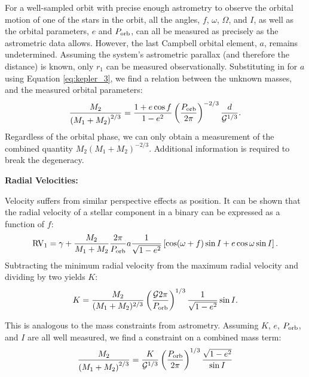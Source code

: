 \documentclass[12pt,preprint]{hackaastex}
\newcommand{\Porb}{\ifmmode {P_{\rm orb}}\else${P_{\rm orb}}$\fi}
\newcommand{\RV}{\ifmmode {{\rm RV}}\else RV \fi}
\newcommand{\bigG}{\ifmmode {\mathcal{G}}\else${\mathcal{G}}$\fi}
\begin{document}
For a well-sampled orbit with precise enough astrometry to observe the orbital motion of one of the stars in the orbit, all the angles, $f$, $\omega$, $\Omega$, and $I$, as well as the orbital parameters, $e$  and $P_{\rm orb}$, can all be measured as precisely as the astrometric data allows. However, the last Campbell orbital element, $a$, remains undetermined. Assuming the system's astrometric parallax (and therefore the distance) is known, only $r_1$ can be measured observationally. Substituting in for $a$ using Equation \ref{eq:kepler_3}, we find a relation between the unknown masses, and the measured orbital parameters:
\begin{equation}
\frac{M_2}{\left( M_1 + M_2 \right)^{2/3}} = \frac{1 + e \cos f}{1 - e^2} \left( \frac{P_{\rm orb}}{2 \pi} \right)^{-2/3} \frac{d}{\mathcal{G}^{1/3}}.
\end{equation}
Regardless of the orbital phase, we can only obtain a measurement of the combined quantity $M_2 \left( M_1 + M_2 \right)^{-2/3}$. Additional information is required to break the degeneracy.





{\large \textbf{ Radial Velocities:}}

Velocity suffers from similar perspective effects as position. It can be shown that the radial velocity of a stellar component in a binary can be expressed as a function of $f$:
\begin{equation}
\RV_1 = \gamma + \frac{M_2}{M_1 + M_2} \frac{2\pi}{\Porb} a \frac{1}{\sqrt{1-e^2}} \left[ \cos(\omega + f) \sin I + e \cos \omega \sin I \right]. 
\end{equation}
Subtracting the minimum radial velocity from the maximum radial velocity and dividing by two yields $K$:
\begin{equation}
K = \frac{M_2}{(M_1 + M_2)^{2/3}} \left( \frac{\bigG 2 \pi}{\Porb}\right)^{1/3} \frac{1}{\sqrt{1-e^2}} \sin I.
\end{equation}

This is analogous to the mass constraints from astrometry. Assuming $K$, $e$, $P_{\rm orb}$, and $I$ are all well measured, we find a constraint on a combined mass term:
\begin{equation}
\frac{M_2}{\left( M_1 + M_2 \right)^{2/3}} = \frac{K}{\bigG^{1/3}} \left( \frac{P_{\rm orb}}{2 \pi} \right)^{1/3} \frac{\sqrt{1-e^2}}{\sin I}
\end{equation}
\end{document}
